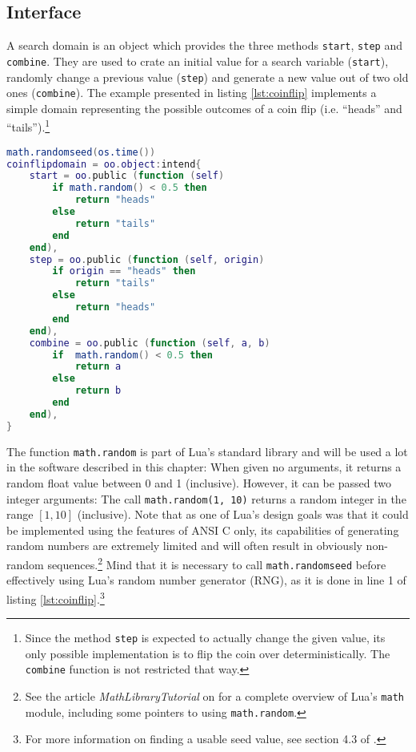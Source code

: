 \subsection{Interface}
\label{sec:evolution:domain}

A search domain is an object which provides the three methods \texttt{start}, \texttt{step} and \texttt{combine}. They are used to crate an initial value for a search variable (\texttt{start}), randomly change a previous value (\texttt{step}) and generate a new value out of two old ones (\texttt{combine}). The example presented in listing \ref{lst:coinflip} implements a simple domain representing the possible outcomes of a coin flip (i.e. ``heads'' and ``tails'').\footnote{Since the method \texttt{step} is expected to actually change the given value, its only possible implementation is to flip the coin over deterministically. The \texttt{combine} function is not restricted that way.}

\begin{lstlisting}[language=lua, caption={A domain representing the results of a coin flip}, label=lst:coinflip, name=lst:coinflip]
math.randomseed(os.time())
coinflipdomain = oo.object:intend{
	start = oo.public (function (self)
		if math.random() < 0.5 then
			return "heads"
		else
			return "tails"
		end
	end),
	step = oo.public (function (self, origin)
		if origin == "heads" then
			return "tails"
		else
			return "heads"
		end
	end),
	combine = oo.public (function (self, a, b)
		if  math.random() < 0.5 then
			return a
		else
			return b
		end
	end),
}
\end{lstlisting}

The function \texttt{math.random} is part of Lua's standard library and will be used a lot in the software described in this chapter: When given no arguments, it returns a random float value between 0 and 1 (inclusive). However, it can be passed two integer arguments: The call \texttt{math.random(1, 10)} returns a random integer in the range $[1, 10]$ (inclusive). Note that as one of Lua's design goals was that it could be implemented using the features of ANSI C only, its capabilities of generating random numbers are extremely limited and will often result in obviously non-random sequences.\footnote{See the article \emph{MathLibraryTutorial} on \cite{LuaUsersWiki} for a complete overview of Lua's \texttt{math} module, including some pointers to using \texttt{math.random}.} Mind that it is necessary to call \texttt{math.randomseed} before effectively using Lua's random number generator (RNG), as it is done in line 1 of listing \ref{lst:coinflip}.\footnote{For more information on finding a usable seed value, see section 4.3 of \cite{Viega2003}.}

